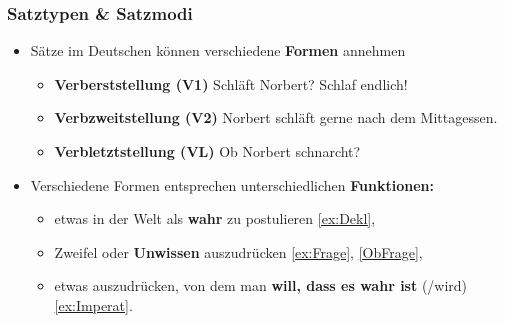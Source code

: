 \begin{frame}
\frametitle{Satztypen \& Satzmodi}

\begin{itemize}
	\item Sätze im Deutschen können verschiedene \textbf{Formen} annehmen
	\begin{itemize}
		\item \textbf{Verberststellung (V1)}
		\eal 
		\ex \label{ex:Frage} \alert{Schläft} Norbert?
		\ex \label{ex:Imperat} \alert{Schlaf} endlich!
		\zl
		
		\item \textbf{Verbzweitstellung (V2)}
		\ea \label{ex:Dekl} Norbert \alert{schläft} gerne nach dem Mittagessen.
		\z
		
		\item \textbf{Verbletztstellung (VL)}
		\ea \label{ObFrage} Ob Norbert \alert{schnarcht}?
		\z
		
	\end{itemize}	
	\item Verschiedene Formen entsprechen unterschiedlichen \textbf{Funktionen:}
	\begin{itemize}
		\item etwas in der Welt als \textbf{wahr} zu postulieren \ref{ex:Dekl},
		\item Zweifel oder \textbf{Unwissen} auszudrücken \ref{ex:Frage}, \ref{ObFrage},
		\item etwas auszudrücken, von dem man \textbf{will, dass es wahr ist} (/wird) \ref{ex:Imperat}.		
	\end{itemize}
\end{itemize}

\end{frame}


